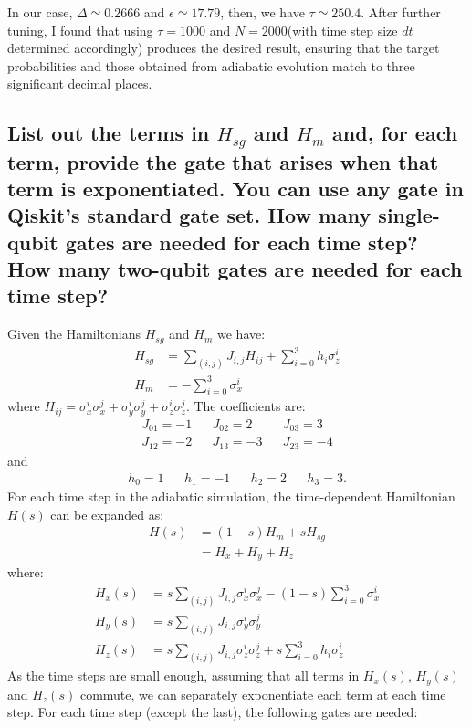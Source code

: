\documentclass[a4paper, 11pt]{article}
\begin{document}
In our case, $\Delta \simeq 0.2666$ and $\epsilon \simeq 17.79$, then, we have $\tau \simeq 250.4$. 
After further tuning, I found that using $\tau=1000$ and $N=2000$(with time step size $dt$ determined accordingly)
produces the desired result, ensuring that the target probabilities and those obtained from adiabatic evolution match to three significant decimal places.

\subsection*{List out the terms in $H_{sg}$ and $H_{m}$ and, for each term, provide the gate that arises when that term is exponentiated. You can use any gate in Qiskit's standard gate set. How many single-qubit gates are needed for each time step? How many two-qubit gates are needed for each time step?}
Given the Hamiltonians  $H_{sg}$ and $H_{m}$ we have:
\begin{align}
  H_{sg} &= \sum_{(i,j)} J_{i,j} H_{ij} + \sum_{i=0}^{3} h_{i}\sigma_{z}^{i} \\
  H_{m} &= -\sum_{i=0}^{3} \sigma_x^{i} 
\end{align}
where $H_{ij} =\sigma_x^{i}\sigma_x^{j} +\sigma_y^{i}\sigma_y^{j} +\sigma_z^{i}\sigma_z^{j} $.
The coefficients are:
\begin{align*}
  J_{01} =-1 && J_{02} = 2 && J_{03} = 3 \\
  J_{12} =-2 && J_{13} =-3 && J_{23} =-4 
\end{align*}
and
\begin{align*}
  h_0 = 1 && h_1 = -1 && h_2 = 2 && h_3 = 3.
\end{align*}
For each time step in the adiabatic simulation, the time-dependent Hamiltonian $H(s)$ can be expanded as:
\begin{align}
  H(s) &= (1-s)H_{m} + sH_{sg} \\
  &= H_{x} + H_{y} + H_{z}
\end{align}
where:
\begin{align}
  H_{x}(s) &= s\sum_{(i,j)} J_{i,j} \sigma_x^{i}\sigma_x^{j} - (1-s) \sum_{i=0}^{3} \sigma_x^{i} \\
  H_{y}(s) &= s\sum_{(i,j)} J_{i,j} \sigma_y^{i}\sigma_y^{j} \\
  H_{z}(s) &= s\sum_{(i,j)} J_{i,j} \sigma_z^{i}\sigma_z^{j} + s \sum_{i=0}^{3} h_i \sigma_z^{i} 
\end{align}
As the time steps are small enough, assuming that all terms in $H_{x}(s)$, $H_{y}(s)$ and $H_{z}(s)$ commute, 
we can separately exponentiate each term at each time step. For each time step (except the last), the following gates are needed:
\end{document}
